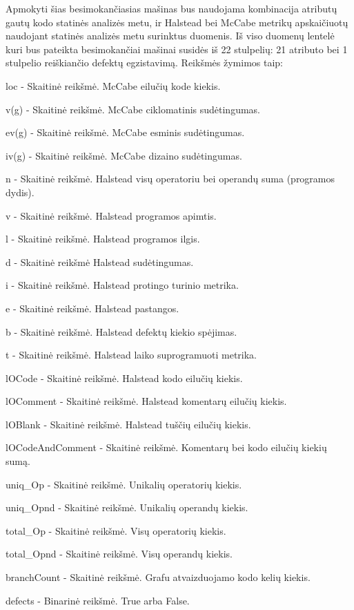 \documentclass{VUMIFPSbakalaurinis}
\begin{document}
Apmokyti šias besimokančiasias mašinas bus naudojama kombinacija atributų gautų kodo statinės analizės metu, ir Halstead bei McCabe metrikų apskaičiuotų naudojant statinės analizės metu surinktus duomenis. Iš viso duomenų lentelė kuri bus pateikta besimokančiai mašinai susidės iš 22 stulpelių: 21 atributo bei 1 stulpelio reiškiančio defektų egzistavimą. Reikšmės žymimos taip:
\begin{description} 
\item loc - Skaitinė reikšmė. McCabe eilučių kode kiekis.
\item v(g) - Skaitinė reikšmė. McCabe ciklomatinis sudėtingumas.
\item ev(g) - Skaitinė reikšmė. McCabe esminis sudėtingumas.
\item iv(g) - Skaitinė reikšmė. McCabe dizaino sudėtingumas.
\item n - Skaitinė reikšmė. Halstead visų operatoriu bei operandų suma (programos dydis).
\item v - Skaitinė reikšmė. Halstead programos apimtis.
\item l - Skaitinė reikšmė. Halstead programos ilgis.
\item d - Skaitinė reikšmė Halstead sudėtingumas.
\item i - Skaitinė reikšmė. Halstead protingo turinio metrika.
\item e - Skaitinė reikšmė. Halstead pastangos.
\item b - Skaitinė reikšmė. Halstead defektų kiekio spėjimas.
\item t - Skaitinė reikšmė. Halstead laiko suprogramuoti metrika.
\item lOCode - Skaitinė reikšmė. Halstead kodo eilučių kiekis.
\item lOComment - Skaitinė reikšmė. Halstead komentarų eilučių kiekis.
\item lOBlank - Skaitinė reikšmė. Halstead tuščių eilučių kiekis.
\item lOCodeAndComment - Skaitinė reikšmė. Komentarų bei kodo eilučių kiekių sumą.
\item uniq\_Op - Skaitinė reikšmė. Unikalių operatorių kiekis.
\item uniq\_Opnd - Skaitinė reikšmė. Unikalių operandų kiekis.
\item total\_Op - Skaitinė reikšmė. Visų operatorių kiekis.
\item total\_Opnd - Skaitinė reikšmė. Visų operandų kiekis.
\item branchCount - Skaitinė reikšmė. Grafu atvaizduojamo kodo kelių kiekis.
\item defects - Binarinė reikšmė. True arba False.
\end{description} 
\end{document}
